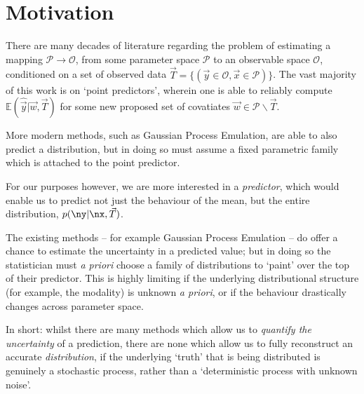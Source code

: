 
\section{Motivation}

	There are many decades of literature regarding the problem of estimating a mapping $\mathcal{P}\to\mathcal{O}$, from some parameter space $\mathcal{P}$ to an observable space $\mathcal{O}$, conditioned on a set of observed data $\vec{T} = \{(\vec{y} \in \mathcal{O}, \vec{x}\in \mathcal{P})\}$. The vast majority of this work is on `point predictors', wherein one is able to reliably compute $\mathbb{E}(\hat{\vec{y}} | \vec{w}, \vec{T})$ for some new proposed set of covatiates $\vec{w}\in \mathcal{P} \backslash{} \vec{T}$. 

	More modern methods, such as Gaussian Process Emulation, are able to also predict a distribution, but in doing so must assume a fixed parametric family which is attached to the point predictor.

	For our purposes however, we are more interested in a \textit{predictor}, which would enable us to predict not just the behaviour of the mean, but the entire distribution, $p(\ny| \nx, \vec{T})$.

	The existing methods -- for example Gaussian Process Emulation -- do offer a chance to estimate the uncertainty in a predicted value; but in doing so the statistician must \textit{a priori} choose a family of distributions to `paint' over the top of their predictor. This is highly limiting if the underlying distributional structure (for example, the modality) is unknown \textit{a priori}, or if the behaviour drastically changes across parameter space. 

	In short: whilst there are many methods which allow us to \textit{quantify the uncertainty} of a prediction, there are none which allow us to fully reconstruct an accurate \textit{distribution}, if the underlying `truth' that is being distributed is genuinely a stochastic process, rather than a `deterministic process with unknown noise'.
	 
	
